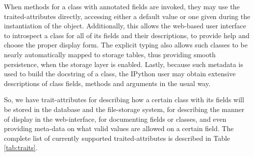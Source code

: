 When methods for a class with annotated fields are invoked, they may use the 
traited-attributes directly, accessing either a default value
or one given during the instantiation of the object. Additionally, this allows
the web-based user interface to introspect a class for all of its fields and their
descriptions, to provide help and choose the proper display form. The explicit typing also allows
such classes to be nearly automatically mapped to storage tables,
thus providing smooth persistence, when the storage layer is enabled.  
Lastly, because such metadata is used to build the docstring of a class,
the IPython user may obtain extensive descriptions of class fields, methods and
arguments in the usual way. 


So, we have trait-attributes for describing how a certain class with its fields 
will be stored in the database and the file-storage system,
for describing the manner of display in the web-interface, for documenting fields or classes, 
and even providing meta-data on what valid values are allowed on a certain field. 
The complete list of currently supported traited-attributes is described in Table \ref{tab:traits}.

